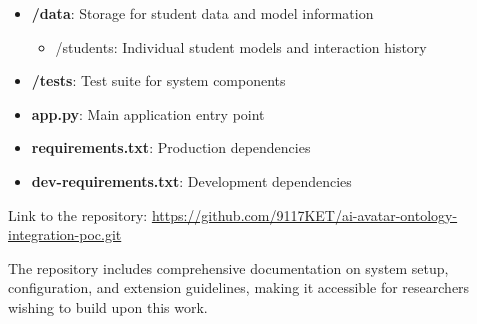 \begin{itemize}
  \item \textbf{/data}: Storage for student data and model information
    \begin{itemize}
      \item /students: Individual student models and interaction history
    \end{itemize}
  
  \item \textbf{/tests}: Test suite for system components
  
  \item \textbf{app.py}: Main application entry point
  \item \textbf{requirements.txt}: Production dependencies
  \item \textbf{dev-requirements.txt}: Development dependencies
\end{itemize}

Link to the repository: \url{https://github.com/9117KET/ai-avatar-ontology-integration-poc.git}

The repository includes comprehensive documentation on system setup, configuration, and extension guidelines, making it accessible for researchers wishing to build upon this work.